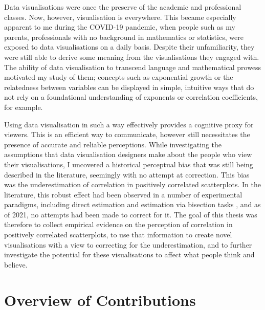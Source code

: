 \documentclass[../main.tex]{subfiles}
\begin{document}
Data visualisations were once the preserve of the academic and
professional classes. Now, however, visualisation is everywhere. This
became especially apparent to me during the COVID-19 pandemic, when
people such as my parents, professionals with no background in
mathematics or statistics, were exposed to data visualisations on a
daily basis. Despite their unfamiliarity, they were still able to derive
some meaning from the visualisations they engaged with. The ability of
data visualisation to transcend language and mathematical prowess
motivated my study of them; concepts such as exponential growth or the
relatedness between variables can be displayed in simple, intuitive ways
that do not rely on a foundational understanding of exponents or
correlation coefficients, for example.

Using data visualisation in such a way effectively provides a cognitive
proxy for viewers. This is an efficient way to communicate, however
still necessitates the presence of accurate and reliable perceptions.
While investigating the assumptions that data visualisation designers
make about the people who view their visualisations, I uncovered a
historical perceptual bias that was still being described in the
literature, seemingly with no attempt at correction. This bias was the
underestimation of correlation in positively correlated scatterplots. In
the literature, this robust effect had been observed in a number of
experimental paradigms, including direct estimation
\cite{strahan_1978, bobko_1979, cleveland_1982, collyer_1990, lane_1985, lauer_1989, meyer_1997}
and estimation via bisection tasks \cite{rensink_2017}, and as of 2021,
no attempts had been made to correct for it. The goal of this thesis was
therefore to collect empirical evidence on the perception of correlation
in positively correlated scatterplots, to use that information to create
novel visualisations with a view to correcting for the underestimation,
and to further investigate the potential for these visualisations to
affect what people think and believe.

\section{Overview of Contributions}\label{contributions-introduction}
\end{document}
